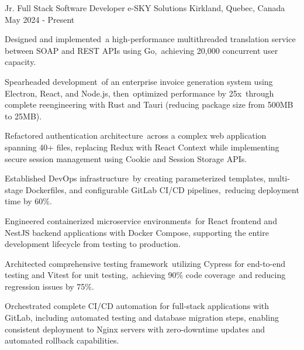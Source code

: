 

\begin{cventries}

  \cventry
   {Jr. Full Stack Software Developer} %
    {e-SKY Solutions} %
    {Kirkland, Quebec, Canada} %
    {May 2024 - Present} %
    {
      \begin{cvitems} %
        \item {Designed and implemented a high-performance multithreaded translation service between SOAP and REST APIs using Go, achieving 20,000 concurrent user capacity.}
        \item {Spearheaded development of an enterprise invoice generation system using Electron, React, and Node.js, then optimized performance by 25x through complete reengineering with Rust and Tauri (reducing package size from 500MB to 25MB).}
        \item {Refactored authentication architecture across a complex web application spanning 40+ files, replacing Redux with React Context while implementing secure session management using Cookie and Session Storage APIs.}
        \item {Established DevOps infrastructure by creating parameterized templates, multi-stage Dockerfiles, and configurable GitLab CI/CD pipelines, reducing deployment time by 60\%.}
        \item {Engineered containerized microservice environments for React frontend and NestJS backend applications with Docker Compose, supporting the entire development lifecycle from testing to production.}
        \item{Architected comprehensive testing framework utilizing Cypress for end-to-end testing and Vitest for unit testing, achieving 90\% code coverage and reducing regression issues by 75\%.}
        \item{Orchestrated complete CI/CD automation for full-stack applications with GitLab, including automated testing and database migration steps, enabling consistent deployment to Nginx servers with zero-downtime updates and automated rollback capabilities.}
      \end{cvitems}
    }
    

\end{cventries}
